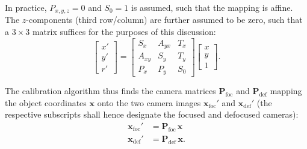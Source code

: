 \documentclass[11.5pt]{book}
\begin{document}
In practice, $P_{x,y,z} = 0$ and $S_0 = 1$ is assumed, such that the mapping is
affine. The $z$-components (third row/column) are further assumed to be zero,
such that a $3 \times 3$ matrix suffices for the purposes of this discussion:
\begin{equation}
\left[\begin{array}{c} x'\\ y'\\ r' \end{array} \right]
=
\left[ \begin{array}{ccc}
S_x & A_{yx} &  T_x \\
A_{xy} & S_y &  T_y \\
P_x & P_y & S_0
\end{array} \right]
\left[ \begin{array}{c} x\\ y \\ 1 \end{array} \right].
\end{equation}

The calibration algorithm thus finds the camera matrices
$\mathbf{P}_\text{foc}$ and $\mathbf{P}_\text{def}$ mapping the
object coordinates $\mathbf{x}$ onto the two camera images
$\mathbf{x}_\text{foc}'$ and $\mathbf{x}_\text{def}'$ (the respective 
    subscripts shall hence designate the focused and defocused
    cameras):
\begin{align}
    \mathbf{x}_\text{foc}' &= \mathbf{P}_\text{foc} \, \mathbf{x} \\
    \mathbf{x}_\text{def}' &= \mathbf{P}_\text{def} \, \mathbf{x}.
\end{align}
\end{document}

